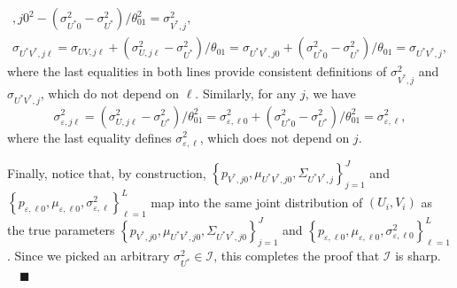 \documentclass[12pt]{article}
\begin{document}
\begin{appendices}
\begin{gather*}
{{},j0}^{2}-(\sigma _{U^{\ast }0}^{2}-\sigma _{U^{\ast }}^{2})/\theta
_{01}^{2}=\sigma _{V^{\ast },j}^{2}, \\
\sigma _{U^{\ast }V^{\ast },j\ell }=\sigma _{UV,j\ell }+(\sigma _{U,j\ell
}^{2}-\sigma _{U^{\ast }}^{2})/\theta _{01}=\sigma _{U^{\ast }V^{\ast
},j0}+(\sigma _{U^{\ast }0}^{2}-\sigma _{U^{\ast }}^{2})/\theta _{01}=\sigma
_{U^{\ast }V^{\ast },j},
\end{gather*}%
where the last equalities in both lines provide consistent definitions of $%
\sigma _{V^{\ast },j}^{2}$ and $\sigma _{U^{\ast }V^{\ast },j}$, which do
not depend on $\ell $. 
Similarly, for any $j$, we have 
\begin{equation*}
\sigma _{\varepsilon ,j\ell }^{2}=(\sigma _{U,j\ell }^{2}-\sigma _{U^{\ast
}}^{2})/\theta _{01}^{2}=\sigma _{\varepsilon ,\ell 0}^{2}+(\sigma _{U^{\ast
}0}^{2}-\sigma _{U^{\ast }}^{2})/\theta _{01}^{2}=\sigma _{\varepsilon ,\ell
}^{2},
\end{equation*}%
where the last equality defines $\sigma _{\varepsilon ,\ell }^{2}$, which
does not depend on $j$.

Finally, notice that, by construction, $\left\{ p_{V^{\ast },j0},\mu
_{U^{\ast }V^{\ast },j0},\Sigma _{U^{\ast }V^{\ast },j}\right\} _{j=1}^{J}$
and $\left\{ p_{\varepsilon ,\ell 0},\mu _{\varepsilon ,\ell 0},\sigma
_{\varepsilon ,\ell }^{2}\right\} _{\ell =1}^{L}$ map into the same joint
distribution of $(U_{i},V_{i})$ as the true parameters $\left\{ p_{V^{\ast
},j0},\mu _{U^{\ast }V^{\ast },j0},\Sigma _{U^{\ast }V^{\ast },j0}\right\}
_{j=1}^{J}$ and $\left\{ p_{\varepsilon ,\ell 0},\mu _{\varepsilon ,\ell
0},\sigma _{\varepsilon ,\ell 0}^{2}\right\} _{\ell =1}^{L}$. Since we
picked an arbitrary $\sigma _{U^{\ast }}^{2}\in \mathcal{I}$, this completes
the proof that $\mathcal{I}$ is sharp.$\quad \blacksquare $

\end{appendices}%
\end{document}
